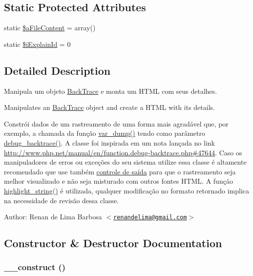\subsection*{Static Protected Attributes}
\begin{CompactItemize}
\item 
static \hyperlink{class_back_trace_explain_a0a32a5b2271bb9f6cd453d6c99512ef}{\$aFileContent} = array()
\item 
static \hyperlink{class_back_trace_explain_e8a5d0c1bcba1c6ea8f4b3e216f924a4}{\$iExplainId} = 0
\end{CompactItemize}


\subsection{Detailed Description}
Manipula um objeto \hyperlink{class_back_trace}{BackTrace} e monta um HTML com seus detalhes.

Manipulates an \hyperlink{class_back_trace}{BackTrace} object and create a HTML with its details.

Constrói dados de um rastreamento de uma forma mais agradável que, por exemplo, a chamada da função \hyperlink{}{var\_\-dump()} tendo como parâmetro \hyperlink{}{debug\_\-backtrace()}. A classe foi inspirada em um nota lançada no link \hyperlink{}{http://www.php.net/manual/en/function.debug-backtrace.php\#47644}. Caso os manipuladores de erros ou exceções do seu sistema utilize essa classe é altamente recomendado que use também \hyperlink{}{controle de saída} para que o rastreamento seja melhor visualizado e não seja misturado com outros fontes HTML. A função \hyperlink{}{highlight\_\-string()} é utilizada, qualquer modificação no formato retornado implica na necessidade de revisão dessa classe.

\begin{Desc}
\item[Author:]Renan de Lima Barbosa $<$\href{mailto:renandelima@gmail.com}{\tt renandelima@gmail.com}$>$ \end{Desc}


\subsection{Constructor \& Destructor Documentation}
\hypertarget{class_back_trace_explain_095c5d389db211932136b53f25f39685}{
\subsubsection[{\_\-\_\-construct}]{\setlength{\rightskip}{0pt plus 5cm}\_\-\_\-construct ()}}
\label{class_back_trace_explain_095c5d389db211932136b53f25f39685}




